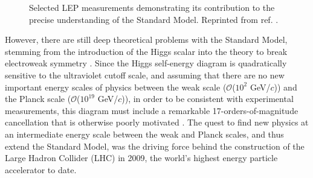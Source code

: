 \documentclass[dissertation.tex]{subfiles}
\begin{document}
\begin{figure}
	\caption{Selected LEP measurements demonstrating its contribution to the precise understanding of the Standard Model.  Reprinted from ref. \cite{Drees}.}
	\label{fig:LEP}
\end{figure}

However, there are still deep theoretical problems with the Standard Model, stemming from the introduction of the Higgs scalar into the theory to break electroweak symmetry \cite{Higgs1964132,PhysRevLett.13.508,PhysRev.145.1156}.  Since the Higgs self-energy diagram is quadratically sensitive to the ultraviolet cutoff scale, and assuming that there are no new important energy scales of physics between the weak scale ($\mathcal{O}$($10^{2}$ GeV/$c$)) and the Planck scale ($\mathcal{O}$($10^{19}$ GeV/$c$)), in order to be consistent with experimental measurements, this diagram must include a remarkable 17-orders-of-magnitude cancellation that is otherwise poorly motivated \cite{Aitchison:1111394}.  The quest to find new physics at an intermediate energy scale between the weak and Planck scales, and thus extend the Standard Model, was the driving force behind the construction of the Large Hadron Collider (LHC) in 2009, the world's highest energy particle accelerator to date.
\end{document}
